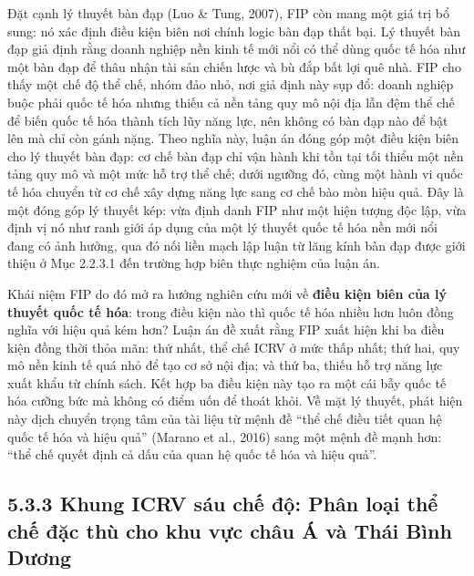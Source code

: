 \documentclass[
  a4paper,
  13pt]{extreport}
\begin{document}
Đặt cạnh lý thuyết bàn đạp (Luo \& Tung, 2007), FIP còn mang một giá trị
bổ sung: nó xác định điều kiện biên nơi chính logic bàn đạp thất bại. Lý
thuyết bàn đạp giả định rằng doanh nghiệp nền kinh tế mới nổi có thể
dùng quốc tế hóa như một bàn đạp để thâu nhận tài sản chiến lược và bù
đắp bất lợi quê nhà. FIP cho thấy một chế độ thể chế, nhóm đảo nhỏ, nơi
giả định này sụp đổ: doanh nghiệp buộc phải quốc tế hóa nhưng thiếu cả
nền tảng quy mô nội địa lẫn đệm thể chế để biến quốc tế hóa thành tích
lũy năng lực, nên không có bàn đạp nào để bật lên mà chỉ còn gánh nặng.
Theo nghĩa này, luận án đóng góp một điều kiện biên cho lý thuyết bàn
đạp: cơ chế bàn đạp chỉ vận hành khi tồn tại tối thiểu một nền tảng quy
mô và một mức hỗ trợ thể chế; dưới ngưỡng đó, cùng một hành vi quốc tế
hóa chuyển từ cơ chế xây dựng năng lực sang cơ chế bào mòn hiệu quả. Đây
là một đóng góp lý thuyết kép: vừa định danh FIP như một hiện tượng độc
lập, vừa định vị nó như ranh giới áp dụng của một lý thuyết quốc tế hóa
nền mới nổi đang có ảnh hưởng, qua đó nối liền mạch lập luận từ lăng
kính bàn đạp được giới thiệu ở Mục 2.2.3.1 đến trường hợp biên thực
nghiệm của luận án.

Khái niệm FIP do đó mở ra hướng nghiên cứu mới về \textbf{điều kiện biên
của lý thuyết quốc tế hóa}: trong điều kiện nào thì quốc tế hóa nhiều
hơn luôn đồng nghĩa với hiệu quả kém hơn? Luận án đề xuất rằng FIP xuất
hiện khi ba điều kiện đồng thời thỏa mãn: thứ nhất, thể chế ICRV ở mức
thấp nhất; thứ hai, quy mô nền kinh tế quá nhỏ để tạo cơ sở nội địa; và
thứ ba, thiếu hỗ trợ năng lực xuất khẩu từ chính sách. Kết hợp ba điều
kiện này tạo ra một cái bẫy quốc tế hóa cưỡng bức mà không có điểm uốn
để thoát khỏi. Về mặt lý thuyết, phát hiện này dịch chuyển trọng tâm của
tài liệu từ mệnh đề ``thể chế điều tiết quan hệ quốc tế hóa và hiệu
quả'' (Marano et al., 2016) sang một mệnh đề mạnh hơn: ``thể chế quyết
định cả dấu của quan hệ quốc tế hóa và hiệu quả''.

\hypertarget{khung-icrv-suxe1u-chux1ebf-ux111ux1ed9-phuxe2n-loux1ea1i-thux1ec3-chux1ebf-ux111ux1eb7c-thuxf9-cho-khu-vux1ef1c-chuxe2u-uxe1-vuxe0-thuxe1i-buxecnh-dux1b0ux1a1ng}{%
\subsection{5.3.3 Khung ICRV sáu chế độ: Phân loại thể chế đặc thù cho
khu vực châu Á và Thái Bình
Dương}\label{khung-icrv-suxe1u-chux1ebf-ux111ux1ed9-phuxe2n-loux1ea1i-thux1ec3-chux1ebf-ux111ux1eb7c-thuxf9-cho-khu-vux1ef1c-chuxe2u-uxe1-vuxe0-thuxe1i-buxecnh-dux1b0ux1a1ng}}
\end{document}

